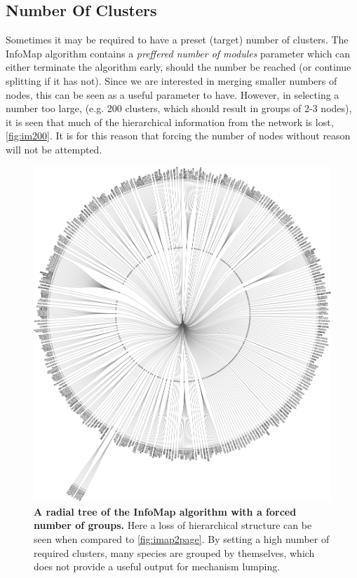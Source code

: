  \subsection{Number Of Clusters}
Sometimes it may be required to have a preset (target) number of clusters. The InfoMap algorithm contains a \emph{preffered number of modules} parameter which can either terminate the algorithm early, should the number be reached (or continue splitting if it has not). Since we are interested in merging smaller numbers of nodes, this can be seen as a useful parameter to have. However, in selecting a number too large, (e.g. 200 clusters, which should result in groups of 2-3 nodes), it is seen that much of the hierarchical information from the network is lost, \autoref{fig:im200}. It is for this reason that forcing the number of nodes without reason will not be attempted.


  \begin{figure}[H]
    \centering
    \includegraphics[width=.8\textwidth]{fig/manygroups.pdf}
    \caption{\textbf{A radial tree of the InfoMap algorithm with a forced number of groups.} Here a loss of hierarchical structure can be seen when compared to \autoref{fig:imap2page}. By setting a high number of required clusters, many species are grouped by themselves, which does not provide a useful output for mechanism lumping. }
        \label{fig:im200}
  \end{figure}






